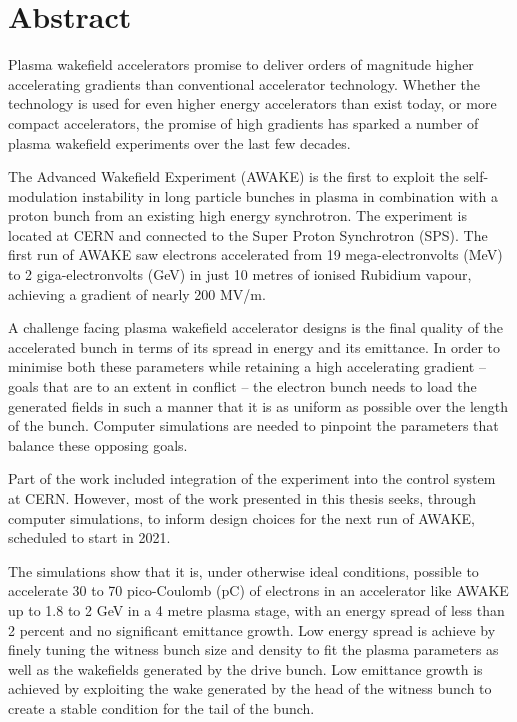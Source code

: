 \chapter*{Abstract}
\label{Abstract}

Plasma wakefield accelerators promise to deliver orders of magnitude higher accelerating gradients than conventional accelerator technology.
Whether the technology is used for even higher energy accelerators than exist today, or more compact accelerators, the promise of high gradients has sparked a number of plasma wakefield experiments over the last few decades.

The Advanced Wakefield Experiment (AWAKE) is the first to exploit the self-modulation instability in long particle bunches in plasma in combination with a proton bunch from an existing high energy synchrotron.
The experiment is located at CERN and connected to the Super Proton Synchrotron (SPS).
The first run of AWAKE saw electrons accelerated from 19 mega-electronvolts (MeV) to 2 giga-electronvolts (GeV) in just 10 metres of ionised Rubidium vapour, achieving a gradient of nearly 200 MV/m.

A challenge facing plasma wakefield accelerator designs is the final quality of the accelerated bunch in terms of its spread in energy and its emittance.
In order to minimise both these parameters while retaining a high accelerating gradient -- goals that are to an extent in conflict -- the electron bunch needs to load the generated fields in such a manner that it is as uniform as possible over the length of the bunch.
Computer simulations are needed to pinpoint the parameters that balance these opposing goals.

Part of the work included integration of the experiment into the control system at CERN.
However, most of the work presented in this thesis seeks, through computer simulations, to inform design choices for the next run of AWAKE, scheduled to start in 2021. 

The simulations show that it is, under otherwise ideal conditions, possible to accelerate 30 to 70 pico-Coulomb (pC) of electrons in an accelerator like AWAKE up to 1.8 to 2 GeV in a 4 metre plasma stage, with an energy spread of less than 2 percent and no significant emittance growth.
Low energy spread is achieve by finely tuning the witness bunch size and density to fit the plasma parameters as well as the wakefields generated by the drive bunch.
Low emittance growth is achieved by exploiting the wake generated by the head of the witness bunch to create a stable condition for the tail of the bunch.
